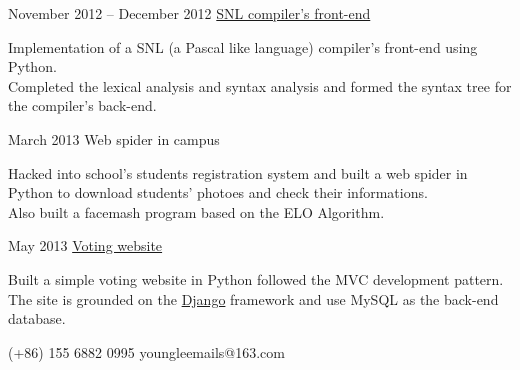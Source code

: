 \documentclass{tccv}
\begin{document}
\begin{eventlist}


\item{November 2012 -- December 2012}    %
  {}
  {\href{https://github.com/YoungLeeNENU/A-samll-compiler-frontend}{SNL compiler's front-end}}

  Implementation of a SNL (a Pascal like language) compiler's front-end using Python. \\
  Completed the lexical analysis and syntax analysis and formed the syntax tree for the compiler's back-end.


\item{March 2013}    %
  {}
  {Web spider in campus}

  Hacked into school's students registration system
  and built a web spider in Python to download students' photoes and check their informations. \\ 
  Also built a facemash program based on the ELO Algorithm.


\item{May 2013}    %
  {}
  {\href{https://github.com/YoungLeeNENU/a-vote-website}{Voting website}}

  Built a simple voting website in Python followed the MVC development pattern. \\ 
  The site is grounded on the \href{https://www.djangoproject.com/}{Django} framework
  and use MySQL as the back-end database.


\end{eventlist}

{(+86) 155 6882 0995}
{youngleemails@163.com}
\end{document}
